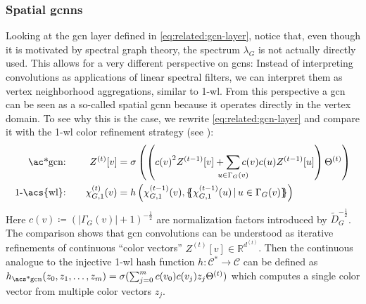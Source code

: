 \subsubsection{Spatial \acp{gcnn}}
Looking at the \ac{gcn} layer defined in \cref{eq:related:gcn-layer}, notice that, even though it is motivated by spectral graph theory, the spectrum $\lambda_G$ is not actually directly used.
This allows for a very different perspective on \acp{gcn}:
Instead of interpreting convolutions as applications of linear spectral filters, we can interpret them as vertex neighborhood aggregations, similar to 1-\acs{wl}.
From this perspective a \ac{gcn} can be seen as a so-called spatial \ac{gcnn} because it operates directly in the vertex domain.
To see why this is the case, we rewrite \cref{eq:related:gcn-layer} and compare it with the 1-\acs{wl} color refinement strategy (see ):
\begin{align*}
	\text{\ac*{gcn}:}\quad&& Z^{(t)}[v] &= \sigma\left(\left( {c(v)}^2 Z^{(t-1)}[v] + \smashoperator[lr]{\sum_{u \in \Gamma_G(v)}} c(v) c(u) Z^{(t-1)}[u] \right) \Theta^{(t)} \right) \\
	\text{1-\acs{wl}:}\quad&& \chi_{G,1}^{(t)}(v) &= h\left( \chi_{G,1}^{(t-1)}(v), \ldblbrace \chi_{G,1}^{(t-1)}(u)\, |\, u \in \Gamma_{G}(v) \rdblbrace\right)
\end{align*}
Here $c(v) \coloneqq {\left(\left| \Gamma_G(v) \right| + 1\right)}^{-\frac{1}{2}}$ are normalization factors introduced by $\tilde{D}_G^{-\frac{1}{2}}$.
The comparison shows that \ac{gcn} convolutions can be understood as iterative refinements of continuous ``color vectors'' $Z^{(t)}[v] \in \mathbb{R}^{d^{(t)}}$.
Then the continuous analogue to the injective 1-\acs{wl} hash function $h: \mathcal{C}^{*} \to \mathcal{C}$ can be defined as $h_{\text{\acs*{gcn}}}(z_0, z_1, \dots, z_m) = \sigma(\sum_{j=0}^m c(v_0) c(v_j) z_j \Theta^{(t)})$ which computes a single color vector from multiple color vectors $z_j$.

